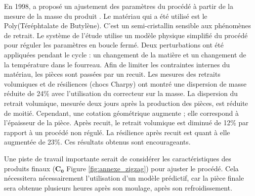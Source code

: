 En 1998, \citeauthor{fournier_conduite_2006} a proposé un ajustement des paramètres du procédé à partir de la mesure de la masse du produit \cite{fournier_conduite_2006}.
Le matériau qui a été utilisé est le Poly(Téréphtalate de Butylène).
C'est un semi-cristallin sensible aux phénomènes de retrait.
Le système de l'étude utilise un modèle physique simplifié du procédé pour réguler les paramètres en boucle fermé.
Deux perturbations ont été appliquées pendant le cycle : un changement de la matière et un changement de la température dans le fourreau.
Afin de limiter les contraintes internes du matériau, les pièces sont passées par un recuit.
Les mesures des retraits volumiques et de résiliences (chocs Charpy) ont montré une dispersion de masse réduite de 24\% avec l'utilisation du correcteur sur la masse.
La dispersion du retrait volumique, mesurée deux jours après la production des pièces, est réduite de moitié.
Cependant, une cotation géométrique augmente ; elle correspond à l'épaisseur de la pièce.
Après recuit, le retrait volumique est diminué de 12\% par rapport à un procédé non régulé.
La résilience après recuit est quant à elle augmentée de 23\%.
Ces résultats obtenus sont encourageants.

Une piste de travail importante serait de considérer les caractéristiques des produits finaux ($\boldsymbol{C_0}$ Figure \ref{fig:annexe_zigzag}) pour ajuster le procédé.
Cela nécessitera nécessairement l'utilisation d'un modèle prédictif, car la pièce finale sera obtenue plusieurs heures après son moulage, après son refroidissement.


